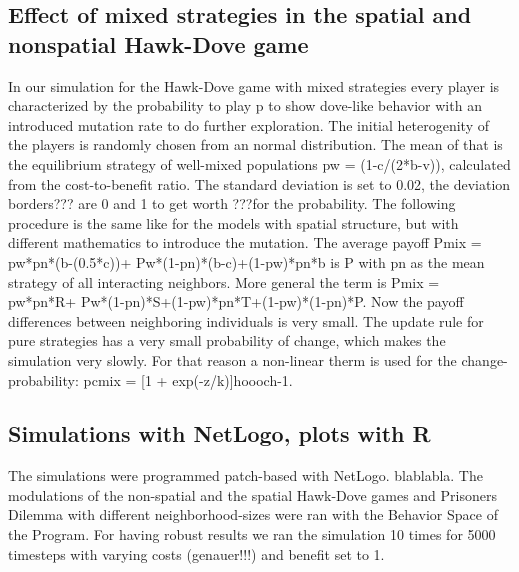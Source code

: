 \subsection{Effect of mixed strategies in the spatial and nonspatial Hawk-Dove game}
In our simulation for the Hawk-Dove game with mixed strategies every player is characterized by the probability to play p to show dove-like behavior with an introduced mutation rate to do further exploration. The initial heterogenity of the players is randomly chosen from an normal distribution. The mean of that is the  equilibrium strategy of well-mixed populations pw = (1-c/(2*b-v)), calculated from the cost-to-benefit ratio. The standard deviation is set to 0.02, the deviation borders??? are 0 and 1 to get worth ???for the  probability. The following procedure is the same like for the models with spatial structure, but with different mathematics to introduce the mutation. The average payoff Pmix = pw*pn*(b-(0.5*c))+ Pw*(1-pn)*(b-c)+(1-pw)*pn*b is P with pn as the mean strategy of all interacting neighbors. More general the term is Pmix = pw*pn*R+ Pw*(1-pn)*S+(1-pw)*pn*T+(1-pw)*(1-pn)*P. Now the  payoff differences between neighboring individuals is very small. The update rule for pure strategies has a very small probability of change, which makes the simulation very slowly. For that reason a non-linear therm is used for the change-probability: pcmix = [1 + exp(-z/k)]hoooch-1.

\subsection{Simulations with NetLogo, plots with R}
The simulations were programmed patch-based with NetLogo. blablabla. The modulations of the non-spatial and the spatial Hawk-Dove games and Prisoners Dilemma with different neighborhood-sizes were ran with the Behavior Space of the Program. For having robust results we ran the simulation 10 times for 5000 timesteps with varying costs (genauer!!!) and benefit set to 1.